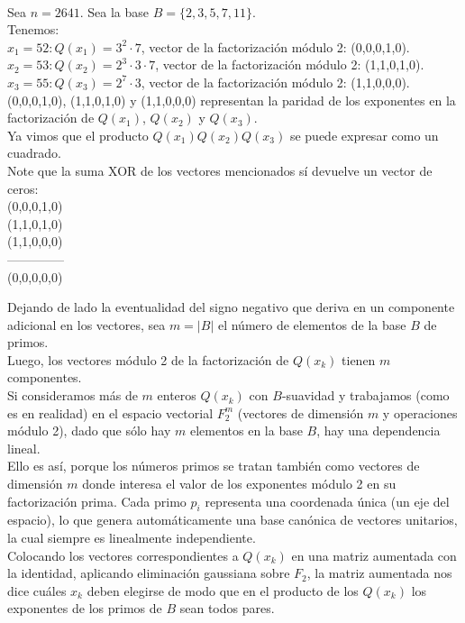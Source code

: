 \begin{ejemplo} \, \\
Sea $n=2641$. Sea la base $B = \{ 2,3,5,7,11 \}$. \\
Tenemos: \\
$x_1=52: Q(x_1)=3^2\cdot 7$, vector de la factorización módulo 2: (0,0,0,1,0). \\
$x_2=53: Q(x_2)=2^3\cdot 3\cdot 7$, vector de la factorización módulo 2: (1,1,0,1,0). \\
$x_3=55: Q(x_3)=2^7\cdot 3$, vector de la factorización módulo 2: (1,1,0,0,0). \\
(0,0,0,1,0), (1,1,0,1,0) y (1,1,0,0,0) representan la paridad de los exponentes en la factorización de $Q(x_1)$, $Q(x_2)$ y $Q(x_3)$. \\
Ya vimos que el producto $Q(x_1)Q(x_2)Q(x_3)$ se puede expresar como un cuadrado. \\
Note que la suma XOR de los vectores mencionados sí devuelve un vector de ceros: \\
(0,0,0,1,0) \\
(1,1,0,1,0) \\
(1,1,0,0,0) \\
-------------- \\
(0,0,0,0,0) 
\end{ejemplo}

Dejando de lado la eventualidad del signo negativo que deriva en un componente adicional en los vectores, sea $m=|B|$ el número de elementos de la base $B$ de primos. \\
Luego, los vectores módulo 2 de la factorización de $Q(x_k)$ tienen $m$ componentes. \\

Si consideramos más de $m$ enteros $Q(x_k)$ con $B$-suavidad y trabajamos (como es en realidad) en el espacio vectorial $F_2^m$ (vectores de dimensión $m$ y operaciones módulo 2), dado que sólo hay $m$ elementos en la base $B$, hay una dependencia lineal. \\
Ello es así, porque los números primos se tratan también como vectores de dimensión $m$ donde interesa el valor de los exponentes módulo 2 en su factorización prima. Cada primo $p_i$ representa una coordenada única (un eje del espacio), lo que genera automáticamente una base canónica de vectores unitarios, la cual siempre es linealmente independiente. \\

Colocando los vectores correspondientes a $Q(x_k)$ en una matriz aumentada con la identidad, aplicando eliminación gaussiana sobre $F_2$, la matriz aumentada nos dice cuáles $x_k$ deben elegirse de modo que en el producto de los $Q(x_k)$ los exponentes de los primos de $B$ sean todos pares. 

